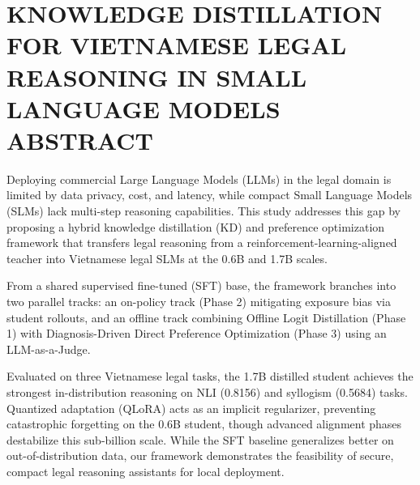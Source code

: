 \chapter*{KNOWLEDGE DISTILLATION FOR VIETNAMESE LEGAL REASONING IN SMALL LANGUAGE MODELS\\ABSTRACT}

Deploying commercial Large Language Models (LLMs) in the legal domain is limited by data privacy, cost, and latency, while compact Small Language Models (SLMs) lack multi-step reasoning capabilities. This study addresses this gap by proposing a hybrid knowledge distillation (KD) and preference optimization framework that transfers legal reasoning from a reinforcement-learning-aligned teacher into Vietnamese legal SLMs at the 0.6B and 1.7B scales.

From a shared supervised fine-tuned (SFT) base, the framework branches into two parallel tracks: an on-policy track (Phase 2) mitigating exposure bias via student rollouts, and an offline track combining Offline Logit Distillation (Phase 1) with Diagnosis-Driven Direct Preference Optimization (Phase 3) using an LLM-as-a-Judge. 

Evaluated on three Vietnamese legal tasks, the 1.7B distilled student achieves the strongest in-distribution reasoning on NLI (0.8156) and syllogism (0.5684) tasks. Quantized adaptation (QLoRA) acts as an implicit regularizer, preventing catastrophic forgetting on the 0.6B student, though advanced alignment phases destabilize this sub-billion scale. While the SFT baseline generalizes better on out-of-distribution data, our framework demonstrates the feasibility of secure, compact legal reasoning assistants for local deployment.
